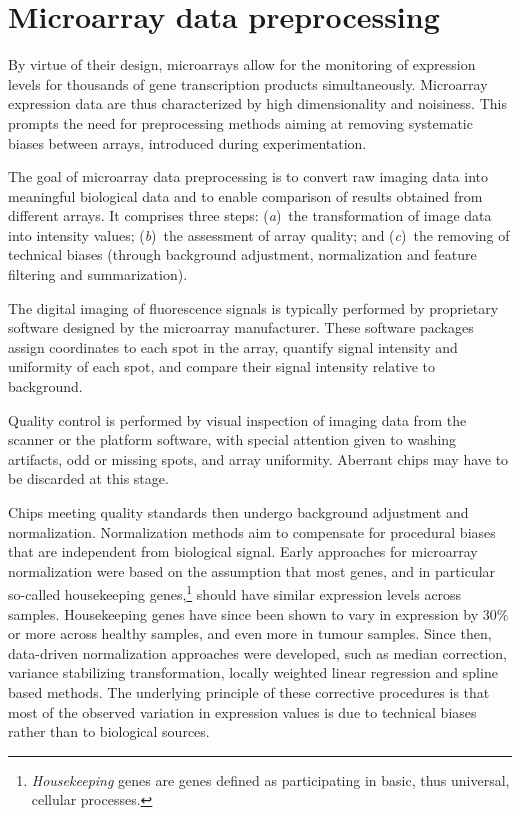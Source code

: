 \section{Microarray data preprocessing}
\label{sec:microarray-methods-data-preprocessing}

By virtue of their design, microarrays allow for the monitoring of expression
levels for thousands of gene transcription products simultaneously.  Microarray
expression data are thus characterized by high dimensionality and noisiness.
This prompts the need for preprocessing methods aiming at removing systematic
biases between arrays, introduced during
experimentation.\cite{shakya_comparison_2010}

The goal of microarray data preprocessing is to convert raw imaging data into
meaningful biological data and to enable comparison of results obtained from
different arrays.  It comprises three steps: (\emph{a})~the transformation of
image data into intensity values; (\emph{b})~the assessment of array quality;
and (\emph{c})~the removing of technical biases (through background adjustment,
normalization and feature filtering and summarization).

The digital imaging of fluorescence signals is typically performed by
proprietary software designed by the microarray manufacturer.  These software
packages assign coordinates to each spot in the array, quantify signal intensity
and uniformity of each spot, and compare their signal intensity relative to
background.

Quality control is performed by visual inspection of imaging data from the
scanner or the platform software, with special attention given to washing
artifacts, odd or missing spots, and array uniformity.  Aberrant chips may have
to be discarded at this stage.

Chips meeting quality standards then undergo background adjustment and
normalization.  Normalization methods aim to compensate for procedural biases
that are independent from biological signal.  Early approaches for microarray
normalization were based on the assumption that most genes, and in particular
so-called housekeeping genes,\footnote{\emph{Housekeeping} genes are genes
  defined as participating in basic, thus universal, cellular processes.}
should have similar expression levels across samples.  Housekeeping genes have
since been shown to vary in expression by 30\% or more across healthy samples,
and even more in tumour samples.\cite{lee_control_2002,eisenberg_human_2003}
Since then, data-driven normalization approaches were developed, such as median
correction,\cite{cho_genome-wide_1998,selinger_rna_2000} variance stabilizing
transformation,\cite{durbin_variance-stabilizing_2002} locally weighted linear
regression\cite{yang_normalization_2002} and spline based
methods.\cite{workman_new_2002} The underlying principle of these corrective
procedures is that most of the observed variation in expression values is due to
technical biases rather than to biological sources.\cite{hicks_when_2014}

